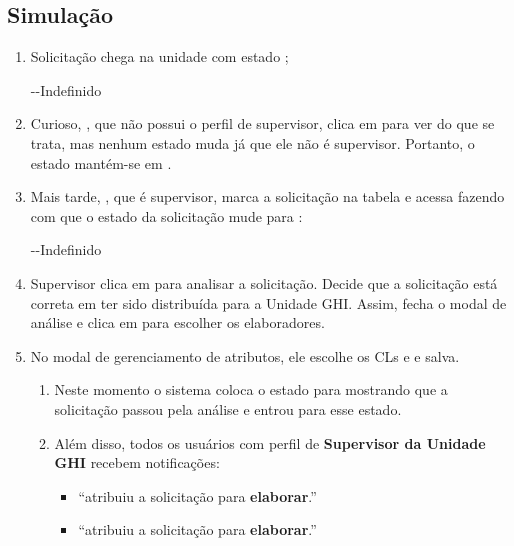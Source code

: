 \begin{landscape}
\subsection*{Simulação}

\begin{enumerate}
	\item Solicitação \SOLU chega na unidade com estado ;

	{}{-}{-}{Indefinido}


	\item Curioso, \EC, que não possui o perfil de supervisor, clica em \bVisualizar para ver do que se trata, mas nenhum estado muda já que ele não é supervisor. Portanto, o estado mantém-se em .

	\item Mais tarde, \SU, que é supervisor, marca a solicitação na tabela e acessa \bVisualizar fazendo com que o estado da solicitação mude para :
	
	{}{-}{-}{Indefinido}
	
	
	\item Supervisor \SU clica em \bAnalisar para analisar a solicitação. Decide que a solicitação está correta em ter sido distribuída para a Unidade GHI.	Assim, fecha o modal de análise e clica em \bGerAtrib para escolher os elaboradores. 
	
	\item No modal de gerenciamento de atributos, ele escolhe os CLs \EU e \ED e salva. 
	
		\begin{enumerate}
			\item Neste momento o sistema coloca o estado para  mostrando que a solicitação passou pela análise e entrou para esse estado. 

			\item Além disso, todos os usuários com perfil de \textbf{Supervisor da Unidade GHI} recebem notificações:
			
			\begin{itemize}
				\item ``\SU atribuiu a solicitação \SOLU para \EU \textbf{elaborar}.'' 
				\item ``\SU atribuiu a solicitação \SOLU para \ED \textbf{elaborar}.''
			\end{itemize}


\end{enumerate}
\end{enumerate}
\end{landscape}
